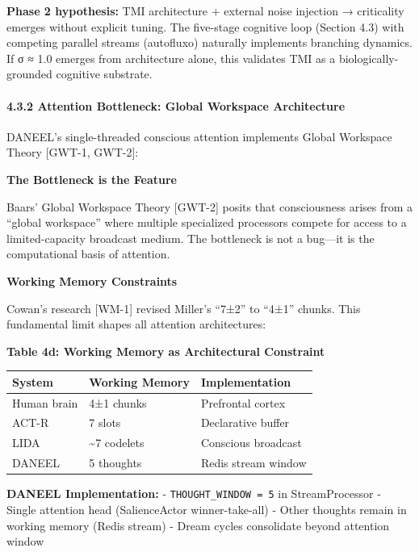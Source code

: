 \documentclass[
  11pt,
]{article}
\newcounter{none} %
\begin{document}
\textbf{Phase 2 hypothesis:} TMI architecture + external noise injection
→ criticality emerges without explicit tuning. The five-stage cognitive
loop (Section 4.3) with competing parallel streams (autofluxo) naturally
implements branching dynamics. If σ ≈ 1.0 emerges from architecture
alone, this validates TMI as a biologically-grounded cognitive
substrate.

\paragraph{4.3.2 Attention Bottleneck: Global Workspace
Architecture}\label{attention-bottleneck-global-workspace-architecture}

DANEEL's single-threaded conscious attention implements Global Workspace
Theory {[}GWT-1, GWT-2{]}:

\textbf{The Bottleneck is the Feature}

Baars' Global Workspace Theory {[}GWT-2{]} posits that consciousness
arises from a ``global workspace'' where multiple specialized processors
compete for access to a limited-capacity broadcast medium. The
bottleneck is not a bug---it is the computational basis of attention.

\textbf{Working Memory Constraints}

Cowan's research {[}WM-1{]} revised Miller's ``7±2'' to ``4±1'' chunks.
This fundamental limit shapes all attention architectures:

\textbf{Table 4d: Working Memory as Architectural Constraint}

{\def\LTcaptype{none} %
\begin{longtable}[]{@{}lll@{}}
\toprule\noalign{}
System & Working Memory & Implementation \\
\midrule\noalign{}
\endhead
\bottomrule\noalign{}
\endlastfoot
Human brain & 4±1 chunks & Prefrontal cortex \\
ACT-R & 7 slots & Declarative buffer \\
LIDA & \textasciitilde7 codelets & Conscious broadcast \\
DANEEL & 5 thoughts & Redis stream window \\
\end{longtable}
}

\textbf{DANEEL Implementation:} - \texttt{THOUGHT\_WINDOW\ =\ 5} in
StreamProcessor - Single attention head (SalienceActor winner-take-all)
- Other thoughts remain in working memory (Redis stream) - Dream cycles
consolidate beyond attention window
\end{document}
